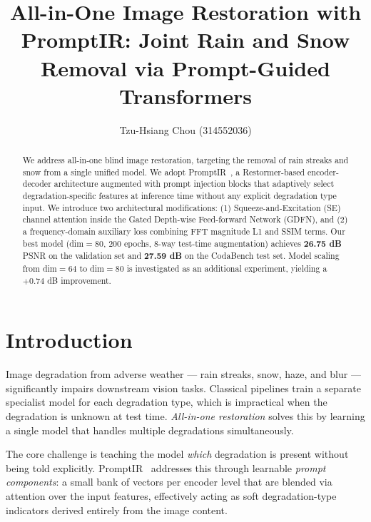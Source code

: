 \documentclass[runningheads]{llncs}
\begin{document}
\title{All-in-One Image Restoration with PromptIR: Joint Rain and Snow Removal via Prompt-Guided Transformers}

\author{Tzu-Hsiang Chou (314552036)}

\maketitle

\begin{abstract}
We address all-in-one blind image restoration, targeting the removal of rain
streaks and snow from a single unified model. We adopt PromptIR~\cite{potlapalli2023promptir},
a Restormer-based encoder-decoder architecture augmented with prompt injection
blocks that adaptively select degradation-specific features at inference time
without any explicit degradation type input. We introduce two architectural
modifications: (1) Squeeze-and-Excitation (SE) channel attention inside the
Gated Depth-wise Feed-forward Network (GDFN), and (2) a frequency-domain
auxiliary loss combining FFT magnitude L1 and SSIM terms. Our best model
(dim$=80$, 200 epochs, 8-way test-time augmentation) achieves
\textbf{26.75 dB} PSNR on the validation set and \textbf{27.59 dB} on the
CodaBench test set. Model scaling from dim$=64$ to dim$=80$ is investigated
as an additional experiment, yielding a $+0.74$ dB improvement.
\end{abstract}

\section{Introduction}

Image degradation from adverse weather --- rain streaks, snow, haze, and
blur --- significantly impairs downstream vision tasks. Classical pipelines
train a separate specialist model for each degradation type, which is
impractical when the degradation is unknown at test time.
\textit{All-in-one restoration} solves this by learning a single model that
handles multiple degradations simultaneously.

The core challenge is teaching the model \emph{which} degradation is present
without being told explicitly. PromptIR~\cite{potlapalli2023promptir} addresses
this through learnable \emph{prompt components}: a small bank of vectors
per encoder level that are blended via attention over the input features,
effectively acting as soft degradation-type indicators derived entirely from
the image content.
\end{document}
